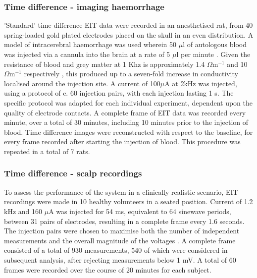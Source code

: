 \subsubsection{Time difference - imaging haemorrhage}
'Standard' time difference EIT data were recorded in an anesthetised rat, from 40 spring-loaded gold plated electrodes placed on the skull in an even distribution. A model of intracerebral haemorrhage was used wherein 50 $\mu$l of autologous blood was injected via a cannula into the brain at a rate of 5 $\mu$l per minute \cite{Dowrick_2016}. Given the resistance of blood and grey matter at 1 Khz is approximately 1.4 $\Omega {\text{m}}^{-1}$ and 10 $\Omega {\text{m}}^{-1}$ respectively \cite{Gabriel_2009}, this produced up to a seven-fold increase in conductivity localised around the injection site. A current of 100\( \mu \)A at 2kHz was injected, using a protocol of c. 60 injection pairs, with each injection lasting 1 s. The specific protocol was adapted for each individual experiment, dependent upon the quality of electrode contacts. A complete frame of EIT data was recorded every minute, over a total of 30 minutes, including 10 minutes prior to the injection of blood.  Time difference images were reconstructed with respect to the baseline, for every frame recorded after starting the injection of blood. This procedure was repeated in a total of 7 rats. 

\subsubsection{Time difference - scalp recordings}
\label{methodsTD}
To assess the performance of the system in a clinically realistic scenario, EIT recordings were made in 10 healthy volunteers in a seated position. Current of 1.2 kHz and 160 $\mu$A was injected for 54 ms, equivalent to 64 sinewave periods, between 31 pairs of electrodes, resulting in a complete frame every 1.6 seconds. The injection pairs were chosen to maximise both the number of independent measurements and the overall magnitude of the voltages \cite{Malone2014a}. A complete frame consisted of a total of 930 measurements, 540 of which were considered in subsequent analysis, after rejecting measurements below 1 mV. A total of 60 frames were recorded over the course of 20 minutes for each subject. 